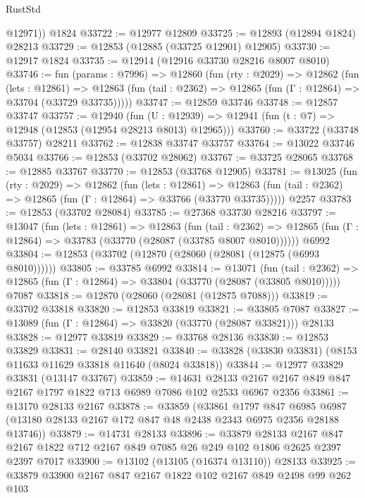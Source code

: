 \begin{lexlean}{RustStd}
\begin{coremodule}
        @12971))
    @1824
@33722 := @12977 @12809
@33725 := @12893 (@12894 @1824) @28213
@33729 := @12853 (@12885 (@33725 @12901) @12905)
@33730 := @12917 @1824
@33735 := @12914 (@12916 @33730 @28216 @8007 @8010)
@33746 := fun (params : @7996) =>
  @12860
    (fun (rty : @2029) =>
    @12862
      (fun (lets : @12861) =>
      @12863 (fun (tail : @2362) => @12865 (fun (Γ : @12864) => @33704 (@33729 @33735)))))
@33747 := @12859 @33746
@33748 := @12857 @33747
@33757 := @12940
    (fun (U : @12939) => @12941 (fun (t : @7) => @12948 (@12853 (@12954 @28213 @8013) @12965)))
@33760 := @33722 (@33748 @33757) @28211
@33762 := @12838 @33747 @33757
@33764 := @13022 @33746 @5034
@33766 := @12853 (@33702 @28062)
@33767 := @33725 @28065
@33768 := @12885 @33767
@33770 := @12853 (@33768 @12905)
@33781 := @13025
    (fun (rty : @2029) =>
    @12862
      (fun (lets : @12861) =>
      @12863 (fun (tail : @2362) => @12865 (fun (Γ : @12864) => @33766 (@33770 @33735)))))
    @2257
@33783 := @12853 (@33702 @28084)
@33785 := @27368 @33730 @28216
@33797 := @13047
    (fun (lets : @12861) =>
    @12863
      (fun (tail : @2362) =>
      @12865 (fun (Γ : @12864) => @33783 (@33770 (@28087 (@33785 @8007 @8010))))))
    @6992
@33804 := @12853 (@33702 (@12870 (@28060 (@28081 (@12875 (@6993 @8010))))))
@33805 := @33785 @6992
@33814 := @13071
    (fun (tail : @2362) => @12865 (fun (Γ : @12864) => @33804 (@33770 (@28087 (@33805 @8010)))))
    @7087
@33818 := @12870 (@28060 (@28081 (@12875 @7088)))
@33819 := @33702 @33818
@33820 := @12853 @33819
@33821 := @33805 @7087
@33827 := @13089 (fun (Γ : @12864) => @33820 (@33770 (@28087 @33821))) @28133
@33828 := @12977 @33819
@33829 := @33768 @28136
@33830 := @12853 @33829
@33831 := @28140 @33821
@33840 := @33828 (@33830 @33831) (@8153 @11633 @11629 @33818 @11640 (@8024 @33818))
@33844 := @12977 @33829 @33831 (@13147 @33767)
@33859 := @14631
    @28133
    @2167
    @2167
    @849
    @847
    @2167
    @1797
    @1822
    @713
    @6989
    @7086
    @102
    @2533
    @6967
    @2356
@33861 := @13170 @28133 @2167
@33878 := @33859
    (@33861
      @1797
      @847
      @6985
      @6987
      (@13180 @28133 @2167 @172 @847 @48 @2438 @2343 @6975 @2356 @28188 @13746))
@33879 := @14731 @28133
@33896 := @33879
    @28133
    @2167
    @847
    @2167
    @1822
    @712
    @2167
    @849
    @7085
    @26
    @249
    @102
    @1806
    @2625
    @2397
    @2397
    @7017
@33900 := @13102 (@13105 (@16374 @13110)) @28133
@33925 := @33879
    @33900
    @2167
    @847
    @2167
    @1822
    @102
    @2167
    @849
    @2498
    @99
    @262
    @103

\end{coremodule}
\end{lexlean}
